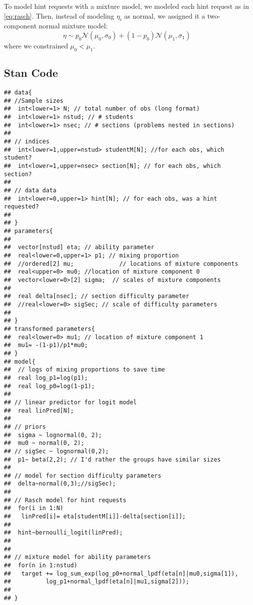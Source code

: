 \documentclass{article}\usepackage[]{graphicx}\usepackage[]{color}
\makeatletter
\newenvironment{kframe}{%
 \def\at@end@of@kframe{}%
 \ifinner\ifhmode%
  \def\at@end@of@kframe{\end{minipage}}%
  \begin{minipage}{\columnwidth}%
 \fi\fi%
 \def\FrameCommand##1{\hskip\@totalleftmargin \hskip-\fboxsep
 \colorbox{shadecolor}{##1}\hskip-\fboxsep
     \hskip-\linewidth \hskip-\@totalleftmargin \hskip\columnwidth}%
 \MakeFramed {\advance\hsize-\width
   \@totalleftmargin\z@ \linewidth\hsize
   \@setminipage}}%
 {\par\unskip\endMakeFramed%
 \at@end@of@kframe}
\newenvironment{knitrout}{}{} %
\renewenvironment{knitrout}{\begin{singlespace}}{\end{singlespace}}
\makeatother
\begin{document}
To model hint requests with a mixture model, we modeled each hint
request as in \eqref{eq:rasch}.
Then, instead of modeling $\eta_i$ as normal, we assigned it a
two-component normal mixture model:
\begin{equation*}
\eta\sim
p_0\mathcal{N}(\mu_0,\sigma_0)+(1-p_0)\mathcal{N}(\mu_1,\sigma_1)
\end{equation*}
where we constrained $\mu_0<\mu_1$.

\subsection{Stan Code}
\begin{knitrout}
\color{fgcolor}\begin{kframe}
\begin{verbatim}
## data{
## //Sample sizes
##  int<lower=1> N; // total number of obs (long format)
##  int<lower=1> nstud; // # students
##  int<lower=1> nsec; // # sections (problems nested in sections)
## 
## // indices
##  int<lower=1,upper=nstud> studentM[N]; //for each obs, which student?
##  int<lower=1,upper=nsec> section[N]; // for each obs, which section?
## 
## // data data
##  int<lower=0,upper=1> hint[N]; // for each obs, was a hint requested?
## 
## }
## parameters{
## 
##  vector[nstud] eta; // ability parameter
##  real<lower=0,upper=1> p1; // mixing proportion
##  //ordered[2] mu;             // locations of mixture components
##  real<upper=0> mu0; //location of mixture component 0
##  vector<lower=0>[2] sigma;  // scales of mixture components
## 
##  real delta[nsec]; // section difficulty parameter
##  //real<lower=0> sigSec; // scale of difficulty parameters
## 
## }
## transformed parameters{
##  real<lower=0> mu1; // location of mixture component 1
##  mu1= -(1-p1)/p1*mu0;
## }
## model{
##  // logs of mixing proportions to save time
##  real log_p1=log(p1);
##  real log_p0=log(1-p1);
## 
## // linear predictor for logit model
##  real linPred[N];
## 
## // priors
##  sigma ~ lognormal(0, 2);
##  mu0 ~ normal(0, 2);
## // sigSec ~ lognormal(0,2);
##  p1~ beta(2,2); // I'd rather the groups have similar sizes
## 
## // model for section difficulty parameters
##  delta~normal(0,3);//sigSec);
## 
## // Rasch model for hint requests
##  for(i in 1:N)
##   linPred[i]= eta[studentM[i]]-delta[section[i]];
## 
##  hint~bernoulli_logit(linPred);
## 
## 
## // mixture model for ability parameters
##  for(n in 1:nstud)
##   target += log_sum_exp(log_p0+normal_lpdf(eta[n]|mu0,sigma[1]),
## 			log_p1+normal_lpdf(eta[n]|mu1,sigma[2]));
## 
## }
\end{verbatim}
\end{kframe}
\end{knitrout}
\end{document}
